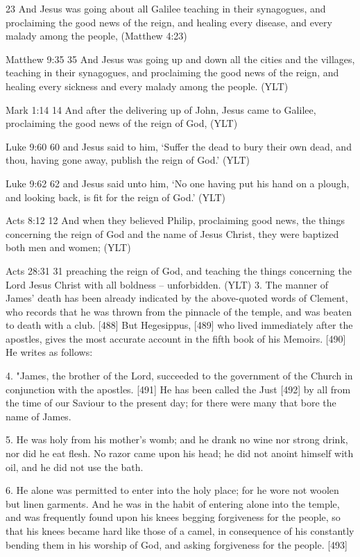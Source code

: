 \documentclass[11pt]{article}
\begin{document}
\begin{thebibliography}{37}
23 And Jesus was going about all Galilee teaching in their synagogues, and proclaiming the good news of the reign, and healing every disease, and every malady among the people,
 (Matthew 4:23)

Matthew 9:35 
35 And Jesus was going up and down all the cities and the villages, teaching in their synagogues, and proclaiming the good news of the reign, and healing every sickness and every malady among the people.
 (YLT)


Mark 1:14 
14 And after the delivering up of John, Jesus came to Galilee, proclaiming the good news of the reign of God,
 (YLT)


Luke 9:60 
60 and Jesus said to him, `Suffer the dead to bury their own dead, and thou, having gone away, publish the reign of God.'
 (YLT)


Luke 9:62 
62 and Jesus said unto him, `No one having put his hand on a plough, and looking back, is fit for the reign of God.'
 (YLT)


Acts 8:12
12 And when they believed Philip, proclaiming good news, the things concerning the reign of God and the name of Jesus Christ, they were baptized both men and women;
 (YLT)

Acts 28:31
31 preaching the reign of God, and teaching the things concerning the Lord Jesus Christ with all boldness -- unforbidden. (YLT)
3. The manner of James' death has been already indicated by the above-quoted words of Clement, who records that he was thrown from the pinnacle of the temple, and was beaten to death with a club. [488] But Hegesippus, [489] who lived immediately after the apostles, gives the most accurate account in the fifth book of his Memoirs. [490] He writes as follows:

4. "James, the brother of the Lord, succeeded to the government of the Church in conjunction with the apostles. [491] He has been called the Just [492] by all from the time of our Saviour to the present day; for there were many that bore the name of James.

5. He was holy from his mother's womb; and he drank no wine nor strong drink, nor did he eat flesh. No razor came upon his head; he did not anoint himself with oil, and he did not use the bath.

6. He alone was permitted to enter into the holy place; for he wore not woolen but linen garments. And he was in the habit of entering alone into the temple, and was frequently found upon his knees begging forgiveness for the people, so that his knees became hard like those of a camel, in consequence of his constantly bending them in his worship of God, and asking forgiveness for the people. [493]


\end{thebibliography}
\end{document}
